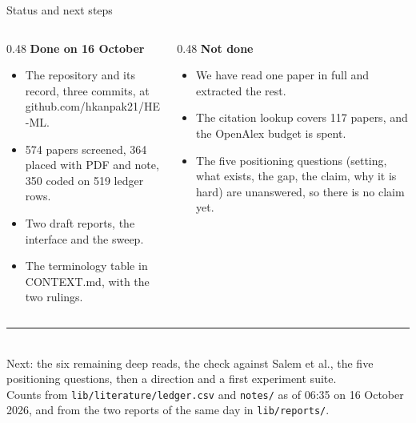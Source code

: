 \documentclass[aspectratio=169,10pt]{beamer}
\newcommand{\redline}{\textcolor{kred}{\rule{\textwidth}{1pt}}}
\begin{document}
\begin{frame}{Status and next steps}
  \begin{columns}[T]
    \begin{column}{0.48\textwidth}
      \textbf{Done on 16 October}
      \begin{itemize}
        \item The repository and its record, three commits, at github.com/hkanpak21/HE-ML.
        \item 574 papers screened, 364 placed with PDF and note, 350 coded on 519 ledger rows.
        \item Two draft reports, the interface and the sweep.
        \item The terminology table in CONTEXT.md, with the two rulings.
      \end{itemize}
    \end{column}
    \begin{column}{0.48\textwidth}
      \textbf{Not done}
      \begin{itemize}
        \item We have read one paper in full and extracted the rest.
        \item The citation lookup covers 117 papers, and the OpenAlex budget is spent.
        \item The five positioning questions (setting, what exists, the gap, the claim, why it is hard) are unanswered, so there is no claim yet.
      \end{itemize}
    \end{column}
  \end{columns}
  \vspace{0.6em}
  \redline\\[0.4em]
  Next: the six remaining deep reads, the check against Salem et al., the five positioning questions, then a direction and a first experiment suite.\\[0.5em]
  {\scriptsize\textcolor{kgrey}{Counts from \texttt{lib/literature/ledger.csv} and \texttt{notes/} as of 06:35 on 16 October 2026, and from the two reports of the same day in \texttt{lib/reports/}.}}
\end{frame}
\end{document}
